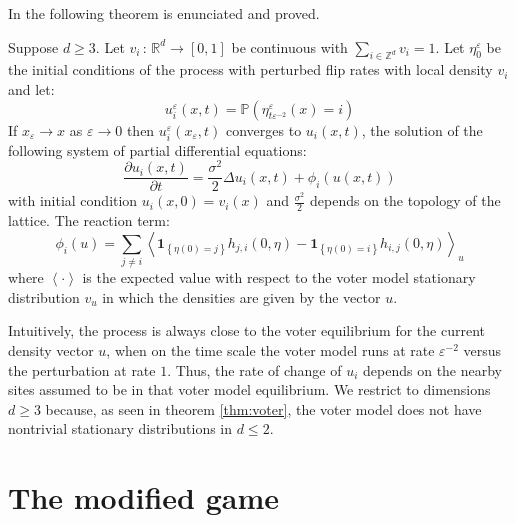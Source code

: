 In \cite{cox_voter_2011,durrett_spatial_2014} the following theorem
is enunciated and proved.
\begin{thm}
\label{thm:RDE-ips}Suppose $d\geq3$. Let $v_{i}\,:\,\mathbb{R}^{d}\rightarrow\left[0,1\right]$
be continuous with $\sum_{i\in\mathbb{Z}^{d}}v_{i}=1$. Let $\eta_{0}^{\varepsilon}$
be the initial conditions of the process with perturbed flip rates
with local density $v_{i}$ and let: 
\[
u_{i}^{\varepsilon}\left(x,t\right)=\mathbb{P}\left(\eta_{t\varepsilon^{-2}}^{\varepsilon}\left(x\right)=i\right)
\]
 If $x_{\varepsilon}\rightarrow x$ as $\varepsilon\to0$ then $u_{i}^{\varepsilon}\left(x_{\varepsilon},t\right)$
converges to $u_{i}\left(x,t\right)$, the solution of the following
system of partial differential equations: 
\begin{equation}
\frac{\partial u_{i}\left(x,t\right)}{\partial t}=\frac{\sigma^{2}}{2}\Delta u_{i}\left(x,t\right)+\phi_{i}\left(u\left(x,t\right)\right)\label{eq:rde}
\end{equation}
with initial condition $u_{i}\left(x,0\right)=v_{i}\left(x\right)$
and $\frac{\sigma^{2}}{2}$ depends on the topology of the lattice.
The reaction term: 
\begin{equation}
\phi_{i}\left(u\right)=\sum_{j\neq i}\left\langle \mathbf{1}_{\left\{ \eta\left(0\right)=j\right\} }h_{j,i}\left(0,\eta\right)-\mathbf{1}_{\left\{ \eta\left(0\right)=i\right\} }h_{i,j}\left(0,\eta\right)\right\rangle _{u}\label{eq:reactionterm}
\end{equation}
where $\left\langle \cdot\right\rangle $ is the expected value with
respect to the voter model stationary distribution $v_{u}$ in which
the densities are given by the vector $u$.
\end{thm}

Intuitively, the process is always close to the voter equilibrium
for the current density vector $u$, when on the time scale the voter
model runs at rate $\varepsilon^{-2}$ versus the perturbation at
rate $1$. Thus, the rate of change of $u_{i}$ depends on the nearby
sites assumed to be in that voter model equilibrium. We restrict to
dimensions $d\geq3$ because, as seen in theorem \ref{thm:voter},
the voter model does not have nontrivial stationary distributions
in $d\leq2$.

\section{The modified game}

